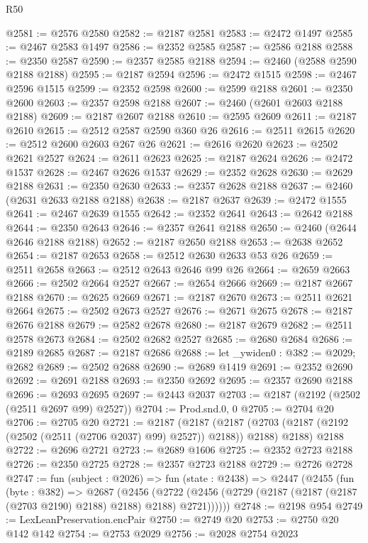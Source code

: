 \begin{lexlean}{R50}
\begin{coremodule}
@2581 := @2576 @2580
@2582 := @2187 @2581
@2583 := @2472 @1497
@2585 := @2467 @2583 @1497
@2586 := @2352 @2585
@2587 := @2586 @2188
@2588 := @2350 @2587
@2590 := @2357 @2585 @2188
@2594 := @2460 (@2588 @2590 @2188 @2188)
@2595 := @2187 @2594
@2596 := @2472 @1515
@2598 := @2467 @2596 @1515
@2599 := @2352 @2598
@2600 := @2599 @2188
@2601 := @2350 @2600
@2603 := @2357 @2598 @2188
@2607 := @2460 (@2601 @2603 @2188 @2188)
@2609 := @2187 @2607 @2188
@2610 := @2595 @2609
@2611 := @2187 @2610
@2615 := @2512 @2587 @2590 @360 @26
@2616 := @2511 @2615
@2620 := @2512 @2600 @2603 @267 @26
@2621 := @2616 @2620
@2623 := @2502 @2621 @2527
@2624 := @2611 @2623
@2625 := @2187 @2624
@2626 := @2472 @1537
@2628 := @2467 @2626 @1537
@2629 := @2352 @2628
@2630 := @2629 @2188
@2631 := @2350 @2630
@2633 := @2357 @2628 @2188
@2637 := @2460 (@2631 @2633 @2188 @2188)
@2638 := @2187 @2637
@2639 := @2472 @1555
@2641 := @2467 @2639 @1555
@2642 := @2352 @2641
@2643 := @2642 @2188
@2644 := @2350 @2643
@2646 := @2357 @2641 @2188
@2650 := @2460 (@2644 @2646 @2188 @2188)
@2652 := @2187 @2650 @2188
@2653 := @2638 @2652
@2654 := @2187 @2653
@2658 := @2512 @2630 @2633 @53 @26
@2659 := @2511 @2658
@2663 := @2512 @2643 @2646 @99 @26
@2664 := @2659 @2663
@2666 := @2502 @2664 @2527
@2667 := @2654 @2666
@2669 := @2187 @2667 @2188
@2670 := @2625 @2669
@2671 := @2187 @2670
@2673 := @2511 @2621 @2664
@2675 := @2502 @2673 @2527
@2676 := @2671 @2675
@2678 := @2187 @2676 @2188
@2679 := @2582 @2678
@2680 := @2187 @2679
@2682 := @2511 @2578 @2673
@2684 := @2502 @2682 @2527
@2685 := @2680 @2684
@2686 := @2189 @2685
@2687 := @2187 @2686
@2688 := let _ywiden0 : @382 := @2029; @2682
@2689 := @2502 @2688
@2690 := @2689 @1419
@2691 := @2352 @2690
@2692 := @2691 @2188
@2693 := @2350 @2692
@2695 := @2357 @2690 @2188
@2696 := @2693 @2695
@2697 := @2443 @2037
@2703 := @2187 (@2192 (@2502 (@2511 @2697 @99) @2527))
@2704 := Prod.snd.{0, 0}
@2705 := @2704 @20
@2706 := @2705 @20
@2721 := @2187
    (@2187
      (@2187 (@2703 (@2187 (@2192 (@2502 (@2511 (@2706 @2037) @99) @2527)) @2188)) @2188)
      @2188)
    @2188
@2722 := @2696 @2721
@2723 := @2689 @1606
@2725 := @2352 @2723 @2188
@2726 := @2350 @2725
@2728 := @2357 @2723 @2188
@2729 := @2726 @2728
@2747 := fun (subject : @2026) =>
  fun (state : @2438) =>
  @2447
    (@2455
      (fun (byte : @382) =>
      @2687
        (@2456
          (@2722 (@2456 (@2729 (@2187 (@2187 (@2187 (@2703 @2190) @2188) @2188) @2188) @2721))))))
@2748 := @2198 @954
@2749 := LexLeanPreservation.encPair
@2750 := @2749 @20
@2753 := @2750 @20 @142 @142
@2754 := @2753 @2029
@2756 := @2028 @2754 @2023

\end{coremodule}
\end{lexlean}
